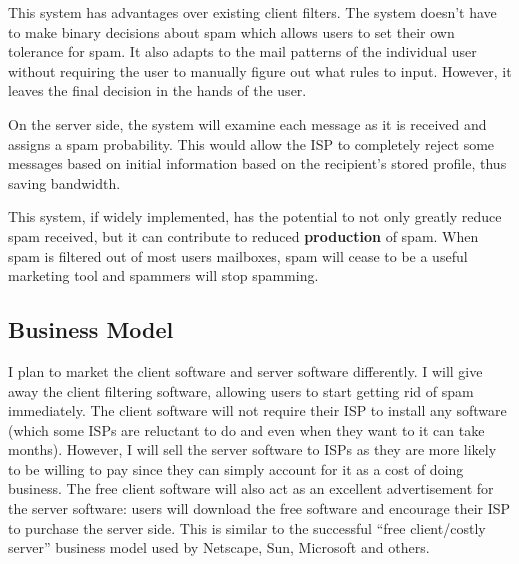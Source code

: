 This system has advantages over existing client filters. The system doesn't
have to make binary decisions about spam which allows users to set their own
tolerance for spam. It also adapts to the mail patterns of the individual user
without requiring the user to manually figure out what rules to input. However,
it leaves the final decision in the hands of the user.


On the server side, the system will examine each message as it is received and
assigns a spam probability. This would allow the ISP to completely reject some
messages based on initial information based on the recipient's stored profile,
thus saving bandwidth.

This system, if widely implemented, has the potential to not only greatly
reduce spam received, but it can contribute to reduced {\bf production} of
spam. When spam is filtered out of most users mailboxes, spam will cease to be
a useful marketing tool and spammers will stop spamming.


\subsection{Business Model}
I plan to market the client software and server software differently. I will
give away the client filtering software, allowing users to start getting rid of
spam immediately. The client software will not require their ISP to install any
software (which some ISPs are reluctant to do and even when they want to it can
take months). However, I will sell the server software to ISPs as they are more
likely to be willing to pay since they can simply account for it as a cost of
doing business. The free client software will also act as an excellent
advertisement for the server software: users will download the free software
and encourage their ISP to purchase the server side. This is similar to the
successful ``free client/costly server'' business model used by Netscape, Sun,
Microsoft and others.

